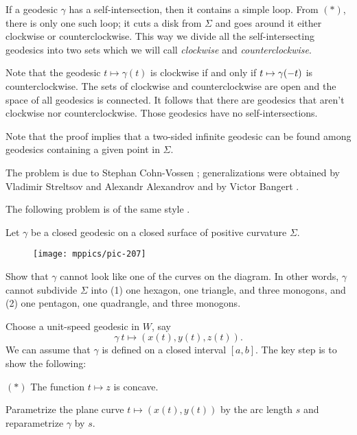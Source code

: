 If a geodesic $\gamma$ has a self-intersection,
then it contains a simple loop.
From $({*})$, there is only one such loop;
it cuts a disk from $\Sigma$ 
and goes around it either clockwise or counterclockwise.
This way we divide all the self-intersecting geodesics 
into two sets which we will call {}\emph{clockwise} and {}\emph{counterclockwise}.

Note that the geodesic $t\mapsto \gamma(t)$ is clockwise 
if and only if 
$t\z\mapsto \gamma(-t)$
is counterclockwise.
The sets of clockwise and counterclockwise are open and the space of all geodesics is connected. 
It follows that there are geodesics that aren't clockwise nor counterclockwise.
Those geodesics have no self-intersections.\qeds

Note that the proof implies that a two-sided infinite geodesic can be found among geodesics containing a given point in $\Sigma$.

The problem is due to Stephan Cohn-Vossen \cite[Satz 9 in][]{convossen};
generalizations were obtained  by 
Vladimir Streltsov and Alexandr Alexandrov 
\cite{streltsov-alexandrov} 
and 
by Victor Bangert \cite{bangert}.

The following problem is of the same style \cite{petrunin-self-crossing-geodesics}.

\begin{pr}
Let $\gamma$ be a closed geodesic on a closed surface of positive curvature $\Sigma$.
\begin{figure}[ht!]
\vskip-0mm
\centering
\texttt{[image: mppics/pic-207]}
\end{figure}
Show that $\gamma$ cannot look like one of the curves on the diagram.
In other words, $\gamma$ cannot subdivide $\Sigma$ into (1) one hexagon, one triangle, and three monogons, and (2) one pentagon, one quadrangle, and three monogons.
\end{pr}



Choose a unit-speed geodesic in $W$, say
\[\gamma\:t\mapsto(x(t),y(t),z(t)).\]
We can assume that $\gamma$ is defined on a closed interval $[a,b]$.
The key step is to show the following:

\begin{cl}{$({*})$} 
The function $t\mapsto z$ is concave.
\end{cl}


Parametrize the plane curve $t\mapsto (x(t),y(t))$ by the arc length $s$
and reparametrize $\gamma$ by $s$.

